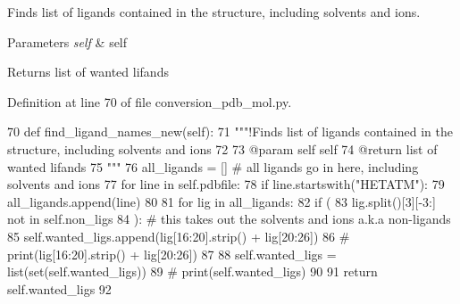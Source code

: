 Finds list of ligands contained in the structure, including solvents and ions. 


\begin{DoxyParams}{Parameters}
{\em self} & self \\
\hline
\end{DoxyParams}
\begin{DoxyReturn}{Returns}
list of wanted lifands 
\end{DoxyReturn}


Definition at line 70 of file conversion\+\_\+pdb\+\_\+mol.\+py.


\begin{DoxyCode}
70     \textcolor{keyword}{def }find\_ligand\_names\_new(self):
71         \textcolor{stringliteral}{"""!Finds list of ligands contained in the structure, including solvents and ions}
72 \textcolor{stringliteral}{}
73 \textcolor{stringliteral}{        @param self self}
74 \textcolor{stringliteral}{        @return list of wanted lifands }
75 \textcolor{stringliteral}{        """}
76         all\_ligands = []  \textcolor{comment}{# all ligands go in here, including solvents and ions}
77         \textcolor{keywordflow}{for} line \textcolor{keywordflow}{in} self.pdbfile:
78             \textcolor{keywordflow}{if} line.startswith(\textcolor{stringliteral}{"HETATM"}):
79                 all\_ligands.append(line)
80 
81         \textcolor{keywordflow}{for} lig \textcolor{keywordflow}{in} all\_ligands:
82             \textcolor{keywordflow}{if} (
83                 lig.split()[3][-3:] \textcolor{keywordflow}{not} \textcolor{keywordflow}{in} self.non\_ligs
84             ):  \textcolor{comment}{# this takes out the solvents and ions a.k.a non-ligands}
85                 self.wanted\_ligs.append(lig[16:20].strip() + lig[20:26])
86                 \textcolor{comment}{# print(lig[16:20].strip() + lig[20:26])}
87 
88         self.wanted\_ligs = list(set(self.wanted\_ligs))
89         \textcolor{comment}{# print(self.wanted\_ligs)}
90 
91         \textcolor{keywordflow}{return} self.wanted\_ligs
92 
\end{DoxyCode}
\mbox{\label{classfragalysis__api_1_1xcimporter_1_1conversion__pdb__mol_1_1_ligand_af0d3d0b75f9f10f0f50cba06017c4ba6}} 
